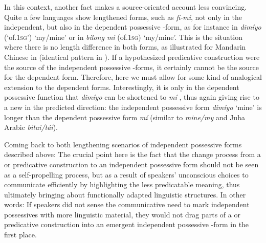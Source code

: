\documentclass[output=paper]{langsci/langscibook}
\begin{document}
In this context, another fact makes a source-oriented account less convincing. Quite a few  languages show lengthened forms, such as \textit{fi-mi}, not only in the independent, but also in the dependent possessive -form, as for instance in  \textit{dimíyo} (‘of.1\textsc{sg}’) ‘my/mine’ or in  \textit{bilong mi} (of.1\textsc{sg}) ‘my/mine’. This is the situation where there is no length difference in both forms, as illustrated for Mandarin  Chinese in  (identical pattern in ). If a hypothesized predicative construction were the source of the independent possessive -forms, it certainly cannot be the source for the dependent form. Therefore, here we must allow for some kind of analogical extension to the dependent forms. Interestingly, it is only in the dependent possessive function that \textit{dimíyo} can be shortened to \textit{mí} \citep{Steinkrüger2013}, thus again giving rise to a new  in the predicted direction: the independent possessive form \textit{dimíyo} ‘mine’ is longer than the dependent possessive form \textit{mí} (similar to  \textit{mine/my} and Juba Arabic \textit{bitai/tái}).

Coming back to both lengthening scenarios of independent possessive forms described above: The crucial point here is the fact that the change process from a  or predicative construction to an independent possessive form should not be seen as a self-propelling  process, but as a result of speakers' unconscious choices to communicate efficiently by highlighting the less predicatable meaning, thus ultimately bringing about functionally adapted linguistic structures. In other words: If speakers did not sense the communicative need to mark independent possessives with more linguistic material, they would not drag parts of a  or predicative construction into an emergent independent possessive -form in the first place. 
\end{document}

